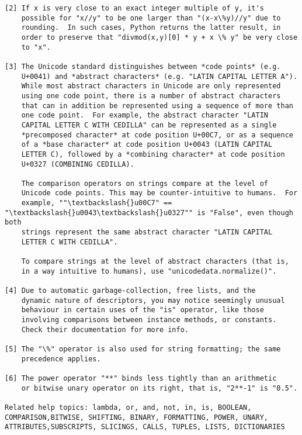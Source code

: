\documentclass[11pt]{article}
\begin{document}
\begin{Verbatim}[commandchars=\\\{\}]
[2] If x is very close to an exact integer multiple of y, it's
    possible for "x//y" to be one larger than "(x-x\%y)//y" due to
    rounding.  In such cases, Python returns the latter result, in
    order to preserve that "divmod(x,y)[0] * y + x \% y" be very close
    to "x".

[3] The Unicode standard distinguishes between *code points* (e.g.
    U+0041) and *abstract characters* (e.g. "LATIN CAPITAL LETTER A").
    While most abstract characters in Unicode are only represented
    using one code point, there is a number of abstract characters
    that can in addition be represented using a sequence of more than
    one code point.  For example, the abstract character "LATIN
    CAPITAL LETTER C WITH CEDILLA" can be represented as a single
    *precomposed character* at code position U+00C7, or as a sequence
    of a *base character* at code position U+0043 (LATIN CAPITAL
    LETTER C), followed by a *combining character* at code position
    U+0327 (COMBINING CEDILLA).

    The comparison operators on strings compare at the level of
    Unicode code points. This may be counter-intuitive to humans.  For
    example, ""\textbackslash{}u00C7" == "\textbackslash{}u0043\textbackslash{}u0327"" is "False", even though both
    strings represent the same abstract character "LATIN CAPITAL
    LETTER C WITH CEDILLA".

    To compare strings at the level of abstract characters (that is,
    in a way intuitive to humans), use "unicodedata.normalize()".

[4] Due to automatic garbage-collection, free lists, and the
    dynamic nature of descriptors, you may notice seemingly unusual
    behaviour in certain uses of the "is" operator, like those
    involving comparisons between instance methods, or constants.
    Check their documentation for more info.

[5] The "\%" operator is also used for string formatting; the same
    precedence applies.

[6] The power operator "**" binds less tightly than an arithmetic
    or bitwise unary operator on its right, that is, "2**-1" is "0.5".

Related help topics: lambda, or, and, not, in, is, BOOLEAN, COMPARISON,BITWISE, SHIFTING, BINARY, FORMATTING, POWER, UNARY, ATTRIBUTES,SUBSCRIPTS, SLICINGS, CALLS, TUPLES, LISTS, DICTIONARIES


    \end{Verbatim}
\end{document}
